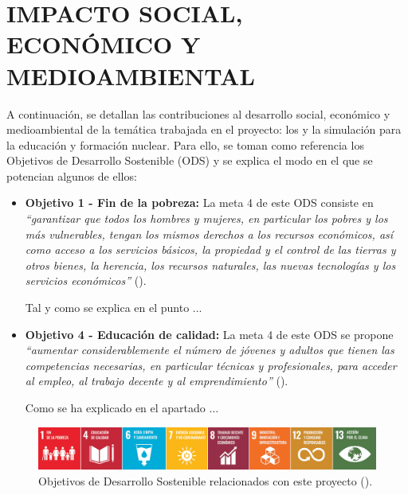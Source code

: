 \newpage
\section{IMPACTO SOCIAL, ECONÓMICO Y MEDIOAMBIENTAL} \label{impacto}

A continuación, se detallan las contribuciones al desarrollo social, económico y medioambiental de la temática trabajada en el proyecto: los  y la simulación para la educación y formación nuclear. Para ello, se toman como referencia los Objetivos de Desarrollo Sostenible (ODS) y se explica el modo en el que se potencian algunos de ellos:

\begin{itemize}
    \item \textbf{Objetivo 1 - Fin de la pobreza:} La meta 4 de este ODS consiste en \textit{``garantizar que todos los hombres y mujeres, en particular los pobres y los más vulnerables, tengan los mismos derechos a los recursos económicos, así como acceso a los servicios básicos, la propiedad y el control de las tierras y otros bienes, la herencia, los recursos naturales, las nuevas tecnologías y los servicios económicos''} (\cite{ODS}).
    
    Tal y como se explica en el punto ...

    \item \textbf{Objetivo 4 - Educación de calidad:} La meta 4 de este ODS se propone \textit{``aumentar considerablemente el número de jóvenes y adultos que tienen las competencias necesarias, en particular técnicas y profesionales, para acceder al empleo, al trabajo decente y al emprendimiento''} (\cite{ODS}).
    
    Como se ha explicado en el apartado ...
\end{itemize}

\begin{figure}[h!]
    \centering
    \includegraphics[width=\textwidth]{content/figures/ODS_TFG.png}
    \caption{Objetivos de Desarrollo Sostenible relacionados con este proyecto (\cite{ODS}).}
    \label{fig:ods_tfg}
  \end{figure}